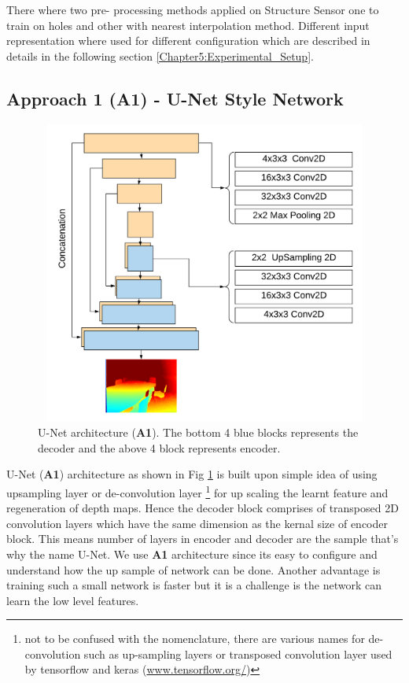 There where two pre- processing methods applied on Structure Sensor one to train on holes and other with nearest interpolation method. Different input representation where used for different configuration which are described in details in the following section \ref{Chapter5:Experimental_Setup}.

\subsection{Approach 1 (A1) - U-Net Style Network}
\label{Chapter5:A1}
\begin{figure}[h]
    \centering
    \includegraphics[width = 12cm, height = 10cm]{Figures/A1.png}
    \caption{U-Net architecture (\textbf{A1}). The bottom 4 blue blocks represents the decoder and the above 4 block represents encoder. }
    \label{fig:A1-U-NetArchetecture}
\end{figure}{}

U-Net (\textbf{A1}) architecture as shown in Fig \ref{fig:A1-U-NetArchetecture} is built upon simple idea of using upsampling layer or de-convolution layer  \footnote{not to be confused with the nomenclature, there are various names for de-convolution such as up-sampling layers or transposed convolution layer used by tensorflow and keras (\url{www.tensorflow.org/})} for up scaling the learnt feature and regeneration of depth maps. Hence the decoder block comprises of transposed 2D convolution layers which have the same dimension as the kernal size of encoder block. This means number of layers in encoder and decoder are the sample that's why the name U-Net. We use \textbf{A1} architecture since its easy to configure and understand how the up sample of network can be done. Another advantage is training such a small network is faster but it is a challenge is the network can learn the low level features. 

